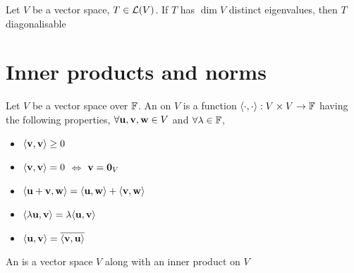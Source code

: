\documentclass[aspectratio=169]{beamer}
\begin{document}
\begin{frame}
\begin{importanttheorem}
Let $V$ be a vector space, $T\in\mathcal{L}(V)$. If $T$ has $\dim V$ distinct eigenvalues, then $T$ diagonalisable
\end{importanttheorem}
\end{frame}






\section{Inner products and norms}

\begin{frame}
\begin{definition}
Let $V$ be a vector space over $\mathbb{F}$. An  on $V$ is a function $\langle\cdot,\cdot\rangle:V\times V\to\mathbb{F}$ having the following properties, $\forall \mathbf{u},\mathbf{v},\mathbf{w}\in V$ and $\forall\lambda\in\mathbb{F}$,
\begin{itemize}
\item $\langle \mathbf{v},\mathbf{v}\rangle \geq 0$ \hfill {}
\item $\langle \mathbf{v},\mathbf{v}\rangle=0$ $\Leftrightarrow$ $\bv=\b0_V$ \hfill {}
\item $\langle \mathbf{u}+\mathbf{v},\mathbf{w}\rangle = \langle \mathbf{u},\mathbf{w}\rangle+ \langle \mathbf{v},\mathbf{w}\rangle$ \hfill{}
\item $\langle \lambda \mathbf{u},\mathbf{v}\rangle =\lambda\langle \mathbf{u},\mathbf{v}\rangle$
\hfill{}
\item $\langle \mathbf{u},\mathbf{v}\rangle =\overline{\langle \mathbf{v},\mathbf{u}\rangle }$
\hfill{}
\end{itemize}
\end{definition}
\vfill
\begin{definition}
An  is a vector space $V$ along with an inner product on $V$
\end{definition}
\end{frame}
\end{document}

